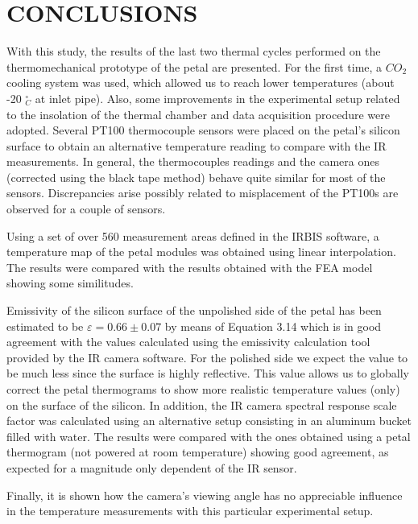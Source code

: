 \pagestyle{conclusions}

\section*{\uppercase{Conclusions}}\label{concl}
	\bigskip
	\bigskip
	With this study, the results of the last two thermal cycles performed on the thermomechanical prototype of the petal are presented. For the first time, a $CO_{2}$ cooling system was used, which allowed us to reach lower temperatures (about -20 $^\circ_{C}$ at inlet pipe). Also, some improvements in the experimental setup related to the insolation of the thermal chamber and data acquisition procedure were adopted. Several PT100 thermocouple sensors were placed on the petal's silicon surface to obtain an alternative temperature reading to compare with the IR measurements. In general, the thermocouples readings and the camera ones (corrected using the black tape method) behave quite similar for most of the sensors. Discrepancies arise possibly related to misplacement of the PT100s are observed for a couple of sensors.\bigskip
	
	Using a set of over 560 measurement areas defined in the IRBIS software, a temperature map of the petal modules was obtained using linear interpolation. The results were compared with the results obtained with the FEA model showing some similitudes.\bigskip
	
	Emissivity of the silicon surface of the unpolished side of the petal has been estimated to be $\varepsilon=0.66\pm0.07$ by means of Equation 3.14 which is in good agreement with the values calculated using the emissivity calculation tool provided by the IR camera software. For the polished side we expect the value to be much less since the surface is highly reflective. This value allows us to globally correct the petal thermograms to show more realistic temperature values (only) on the surface of the silicon.\bigskip
	In addition, the IR camera spectral response scale factor was calculated using an alternative setup consisting in an aluminum bucket filled with water. The results were compared with the ones obtained using a petal thermogram (not powered at room temperature) showing good agreement, as expected for a magnitude only dependent of the IR sensor.\bigskip
	
	Finally, it is shown how the camera's viewing angle has no appreciable influence in the temperature measurements with this particular experimental setup. 
	